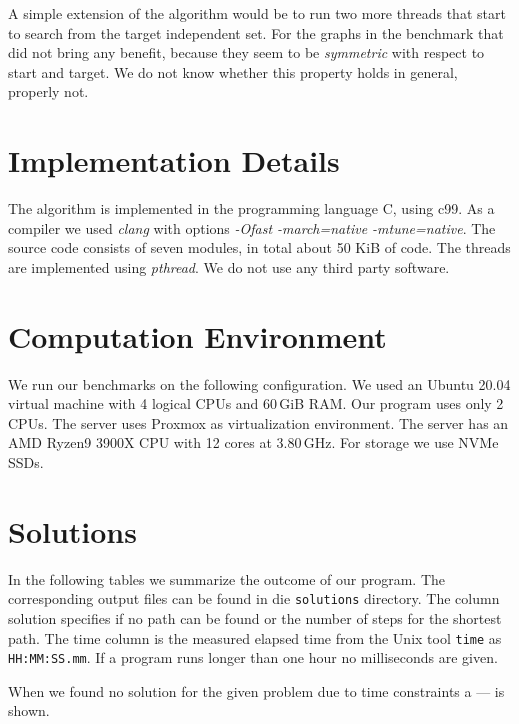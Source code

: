 \documentclass{article}
\begin{document}
A simple extension of the algorithm would be to run two more threads
that start to search from the target independent set. For the graphs
in the benchmark that did not bring any benefit, because they seem to
be {\em symmetric} with respect to start and target. We do not know
whether this property holds in general, properly not.

\section{Implementation Details}
The algorithm is implemented in the programming language C, using c99.
As a compiler we used {\em clang} with options {\em -Ofast
  -march=native -mtune=native}. The source code consists of seven
modules, in total about 50 KiB of code. The threads are implemented
using {\em pthread}. We do not use any third party software.

\section{Computation Environment}

We run our benchmarks on the following configuration. We used an Ubuntu 20.04
virtual machine with 4 logical CPUs and 60\,GiB RAM. Our program uses only 2
CPUs. The server uses Proxmox as virtualization environment. The server has an
AMD Ryzen9 3900X CPU with 12 cores at 3.80\,GHz. For storage we use NVMe SSDs.

\section{Solutions}

In the following tables we summarize the outcome of our program. The
corresponding output files can be found in die \texttt{solutions} directory.
The column solution specifies if no path can be found or the number of steps
for the shortest path. The time column is the measured elapsed time from the
Unix tool \texttt{time} as \texttt{HH:MM:SS.mm}. If a program runs longer than
one hour no milliseconds are given.

When we found no solution for the given problem due to time constraints a ---
is shown.
\end{document}
